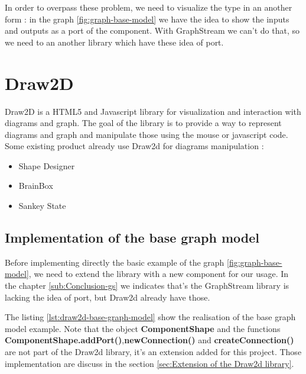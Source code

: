 In order to overpass these problem, we need to visualize the type in an another form : in the graph \ref{fig:graph-base-model} we have the idea to show the inputs and outputs as a port of the component. With GraphStream we can't do that, so we need to an another library which have these idea of port.



\section{Draw2D}
\label{sec:Draw2D}

Draw2D is a HTML5 and Javascript library for visualization and interaction with diagrams and graph\cite{draw2d}. The goal of the library is to provide a way to represent diagrams and graph and manipulate those using the mouse or javascript code. Some existing product already use Draw2d for diagrams manipulation :

\begin{itemize}
\item Shape Designer\cite{draw2d}
\item BrainBox\cite{draw2d}
\item Sankey State\cite{draw2d}
\end{itemize}

\subsection{Implementation of the base graph model}
\label{sub:Implementation of the base graph model}

Before implementing directly the basic example of the graph \ref{fig:graph-base-model},
we need to extend the library with a new component for our usage.
In the chapter \ref{sub:Conclusion-gs} we indicates that's the GraphStream library is lacking the idea of port, but Draw2d already have those.

The listing \ref{lst:draw2d-base-graph-model} show the realisation of the base graph model example.
Note that the object \textbf{ComponentShape} and the functions \textbf{ComponentShape.addPort()},\textbf{newConnection()} and
\textbf{createConnection()} are not part of the Draw2d library, it's an extension added for this project. Those implementation are discuss in the section \ref{sec:Extension of the Draw2d library}.

